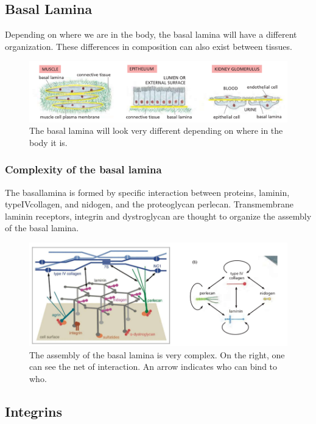 \documentclass[../main.tex]{subfiles}
\begin{document}
\subsection{Basal Lamina}

Depending on where we are in the body, the basal lamina will have a different organization. These differences in composition can also exist between tissues.
\begin{figure}[H]
	\centering
	\includegraphics[width=0.7\linewidth]{bl_diff}
	\caption{The basal lamina will look very different depending on where in the body it is.}
	\label{fig:bldiff}
\end{figure}

\subsubsection{Complexity of the basal lamina}

The \gls{basallamina} is formed by specific interaction between proteins, \gls{laminin}, \gls{typeIVcollagen}, and \gls{nidogen}, and the \gls{proteoglycan} \gls{perlecan}. Transmembrane laminin receptors, \gls{integrin} and \gls{dystroglycan} are thought to organize the assembly of the basal lamina.

\begin{figure}[H]
	\centering
	\includegraphics[width=0.8\linewidth]{bl_form}
	\caption{The assembly of the basal lamina is very complex. On the right, one can see the net of interaction. An arrow indicates who can bind to who.}
	\label{fig:blform}
\end{figure}


\subsection{Integrins}
\label{integrins}
\end{document}
